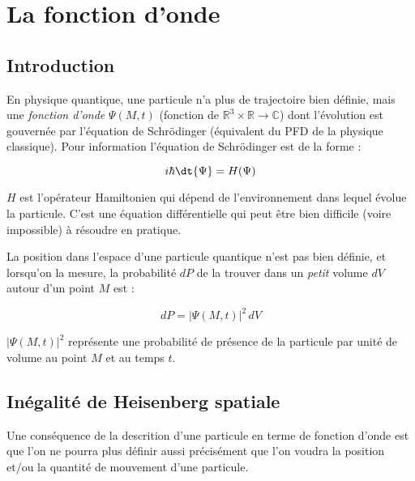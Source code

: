 \documentclass[MPSI]{cours}
\begin{document}
\section{La fonction d'onde}
\subsection{Introduction}%
\label{sub:introduction}

En physique quantique, une particule n'a plus de trajectoire bien définie, mais une \emph{fonction d'onde} $\Psi(M, t)$ (fonction de $\mathbb{R}^3\times\mathbb{R} \rightarrow \mathbb{C}$) dont l'évolution est gouvernée par l'équation de Schrödinger (équivalent du PFD de la physique classique). Pour information l'équation de Schrödinger est de la forme :

\begin{equation*}
  i\hbar \dt{\Psi} = H(\Psi)
\end{equation*}

$H$ est l'opérateur Hamiltonien qui dépend de l'environnement dans lequel évolue la particule. C'est une équation différentielle qui peut être bien difficile (voire impossible) à résoudre en pratique.

La position dans l'espace d'une particule quantique n'est pas bien définie, et lorsqu'on la mesure, la probabilité $dP$ de la trouver dans un \emph{petit} volume $dV$ autour d'un point $M$ est :

\begin{equation*}
  dP = |\Psi(M, t)|^2\,dV
\end{equation*}

$|\Psi(M, t)|^2$ représente une probabilité de présence de la particule par unité de volume au point $M$ et au temps $t$. 

\subsection{Inégalité de Heisenberg spatiale}%
\label{sub:inegalite_de_heisenberg_spatiale}

Une conséquence de la descrition d'une particule en terme de fonction d'onde est que l'on ne pourra plus définir aussi précisément que l'on voudra la position et/ou la quantité de mouvement d'une particule.
\end{document}

